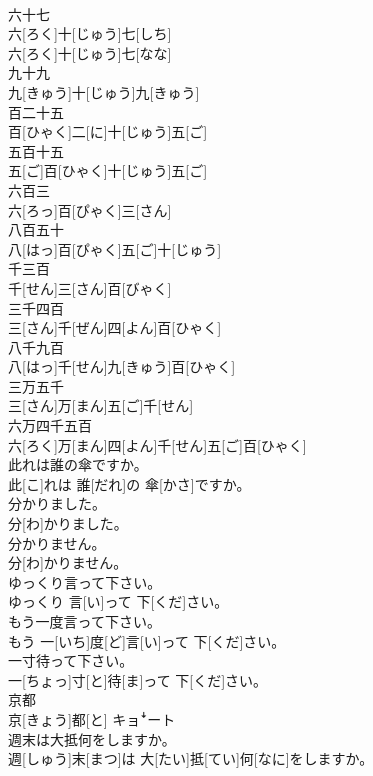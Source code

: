 \documentclass[8pt]{extreport}
\begin{document}
\begin{CJK}{UTF8}{min}
\\	六十七	
\\	六[ろく]十[じゅう]七[しち] 
\\	六[ろく]十[じゅう]七[なな]	
\\	九十九	
\\	九[きゅう]十[じゅう]九[きゅう]
\\	百二十五	
\\	百[ひゃく]二[に]十[じゅう]五[ご]	
\\	五百十五	
\\	五[ご]百[ひゃく]十[じゅう]五[ご]
\\	六百三	
\\	六[ろっ]百[ぴゃく]三[さん]	
\\	八百五十	
\\	八[はっ]百[ぴゃく]五[ご]十[じゅう]	
\\	千三百	
\\	千[せん]三[さん]百[びゃく]	
\\	三千四百	
\\	三[さん]千[ぜん]四[よん]百[ひゃく]
\\	八千九百	
\\	八[はっ]千[せん]九[きゅう]百[ひゃく]	
\\	三万五千	
\\	三[さん]万[まん]五[ご]千[せん]
\\	六万四千五百	
\\	六[ろく]万[まん]四[よん]千[せん]五[ご]百[ひゃく]	
\\	此れは誰の傘ですか。	
\\	此[こ]れは 誰[だれ]の 傘[かさ]ですか。
\\	分かりました。	
\\	分[わ]かりました。
\\	分かりません。	
\\	分[わ]かりません。
\\	ゆっくり言って下さい。	
\\	ゆっくり 言[い]って 下[くだ]さい。
\\	もう一度言って下さい。	
\\	もう 一[いち]度[ど]言[い]って 下[くだ]さい。
\\	一寸待って下さい。	
\\	一[ちょっ]寸[と]待[ま]って 下[くだ]さい。
\\	京都	
\\	京[きょう]都[と]	キョꜜート
\\	週末は大抵何をしますか。	
\\	週[しゅう]末[まつ]は 大[たい]抵[てい]何[なに]をしますか。

\end{CJK}
\end{document}
